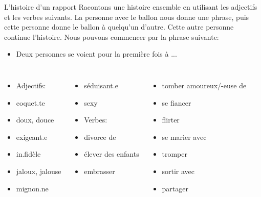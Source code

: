 \begin{frame}{L'histoire d'un rapport}
  Racontons une histoire ensemble en utilisant les adjectifs et les verbes suivants.
  La personne avec le ballon nous donne une phrase, puis cette personne donne le ballon à quelqu'un d'autre.
  Cette autre personne continue l'histoire.
  Nous pouvons commencer par la phrase suivante:
  \begin{itemize}
    \item Deux personnes se voient pour la première fois à ...
  \end{itemize}
  \begin{columns}[t]
      \begin{itemize}
        \item[] \alert{Adjectifs:}
        \item coquet.te
        \item doux, douce
        \item exigeant.e
        \item in.fidèle
        \item jaloux, jalouse
        \item mignon.ne
      \end{itemize}
      \begin{itemize}
        \item séduisant.e
        \item sexy
        \item[] \alert{Verbes:}
        \item divorce de
        \item élever des enfants
        \item embrasser
      \end{itemize}
      \begin{itemize}
        \item tomber amoureux/-euse de
        \item se fiancer
        \item flirter
        \item se marier avec
        \item tromper
        \item sortir avec
        \item partager
      \end{itemize}
  \end{columns}
\end{frame}